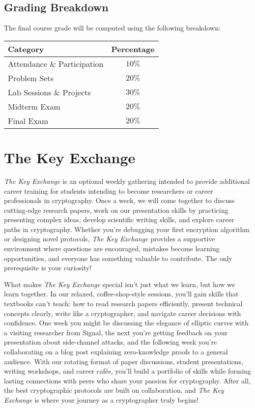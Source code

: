 \documentclass[10pt,a4paper,american]{article}
\begin{document}
\subsection{Grading Breakdown}
The final course grade will be computed using the following breakdown:

\begin{center}
	\renewcommand{\arraystretch}{2}
	\begin{tabular}{|p{2.5in}|c|}
		\hline
		\textbf{Category} & \textbf{Percentage} \\
		\hline
		Attendance \& Participation               & $10\%$              \\
		\hline
		Problem Sets                              & $20\%$              \\
		\hline
		Lab Sessions \& Projects                  & $30\%$              \\
		\hline
		Midterm Exam                              & $20\%$              \\
		\hline
		Final Exam                                & $20\%$              \\
		\hline
	\end{tabular}
\end{center}

\section{The Key Exchange}
\textit{The Key Exchange} is an optional weekly gathering intended to provide additional career training for students intending to become researchers or career professionals in cryptography. Once a week, we will come together to discuss cutting-edge research papers, work on our presentation skills by practicing presenting complex ideas, develop scientific writing skills, and explore career paths in cryptography. Whether you're debugging your first encryption algorithm or designing novel protocols, \textit{The Key Exchange} provides a supportive environment where questions are encouraged, mistakes become learning opportunities, and everyone has something valuable to contribute. The only prerequisite is your curiosity!

What makes \textit{The Key Exchange} special isn't just what we learn, but how we learn together. In our relaxed, coffee-shop-style sessions, you'll gain skills that textbooks can't teach: how to read research papers efficiently, present technical concepts clearly, write like a cryptographer, and navigate career decisions with confidence. One week you might be discussing the elegance of elliptic curves with a visiting researcher from Signal, the next you're getting feedback on your presentation about side-channel attacks, and the following week you're collaborating on a blog post explaining zero-knowledge proofs to a general audience. With our rotating format of paper discussions, student presentations, writing workshops, and career cafés, you'll build a portfolio of skills while forming lasting connections with peers who share your passion for cryptography. After all, the best cryptographic protocols are built on collaboration, and \textit{The Key Exchange} is where your journey as a cryptographer truly begins!
\end{document}
